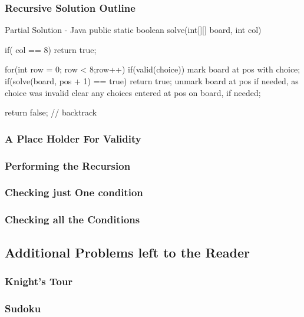 \subsubsection{Recursive Solution Outline}
\begin{javacode}{Partial Solution - Java}
public static boolean solve(int[][] board, int col){
	
	if( col == 8){
		return true;
	}
	
	for(int row = 0; row < 8;row++){
		if(valid(choice)){
			mark board at pos with choice;
			if(solve(board, pos + 1) == true){
				return true;
			}
			unmark board at pos if needed, as choice was invalid
		}
	}
	clear any choices entered at pos on board, if needed;
	
	return false; // backtrack
}

\end{javacode}

\subsubsection{A Place Holder For Validity}

\subsubsection{Performing the Recursion}

\subsubsection{Checking just One condition}


\subsubsection{Checking all the Conditions}




\subsection{Additional Problems left to the Reader}

\subsubsection{Knight's Tour}

\subsubsection{Sudoku}



